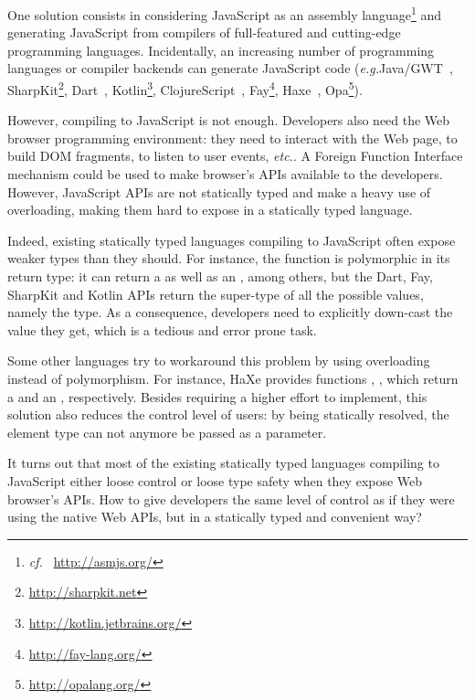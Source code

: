 \documentclass[runningheads,a4paper]{llncs}
\newcommand{\eg}{\emph{e.g.}}
\newcommand{\cf}{\emph{cf.~}}
\newcommand{\etc}{\emph{etc.}}
\begin{document}
One solution consists in considering JavaScript as an assembly language\footnote{\cf
\href{http://asmjs.org/}{http://asmjs.org/}} and generating JavaScript from compilers of full-featured and
cutting-edge programming languages. Incidentally, an increasing number of programming languages or compiler backends
can generate JavaScript code (\eg Java/GWT~\cite{Chaganti07_GWT},
SharpKit\footnote{\href{http://sharpkit.net}{http://sharpkit.net}}, Dart~\cite{Griffith11_Dart},
Kotlin\footnote{\href{http://kotlin.jetbrains.org/}{http://kotlin.jetbrains.org/}},
ClojureScript~\cite{McGranaghan11_ClojureScript}, Fay\footnote{\href{http://fay-lang.org/}{http://fay-lang.org/}},
Haxe~\cite{Cannasse08_HaXe}, Opa\footnote{\href{http://opalang.org/}{http://opalang.org/}}).

However, compiling to JavaScript is not enough. Developers also need the Web browser programming environment: they
need to interact with the Web page, to build DOM fragments, to listen to user events, \etc. A Foreign Function
Interface mechanism could be used to make browser’s APIs available to the developers. However, JavaScript APIs are
not statically typed and make a heavy use of overloading, making them hard to expose in a statically typed language.

Indeed, existing statically typed languages compiling to JavaScript often expose weaker types than they should. For
instance, the function  is polymorphic in its return type: it can return a  as
well as an , among others, but the Dart, Fay, SharpKit and Kotlin APIs return the super-type of
all the possible values, namely the  type. As a consequence, developers need to explicitly down-cast
the value they get, which is a tedious and error prone task.

Some other languages try to workaround this problem by using overloading instead of polymorphism. For instance, HaXe
provides functions , , which return a  and an
, respectively. Besides requiring a higher effort to implement, this solution also reduces the
control level of users: by being statically resolved, the element type can not anymore be passed as a parameter.

It turns out that most of the existing statically typed languages compiling to JavaScript either loose control or
loose type safety when they expose Web browser’s APIs. How to give developers the same level of control as if they
were using the native Web APIs, but in a statically typed and convenient way?
\end{document}
